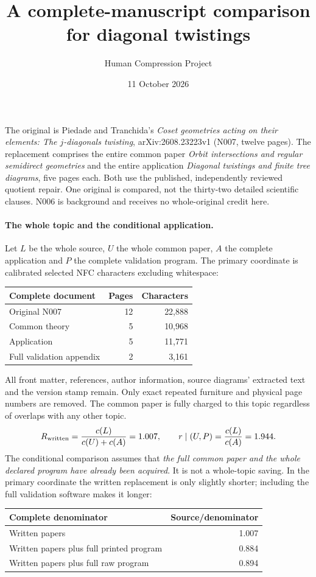 \documentclass[11pt,a4paper]{article}
\title{A complete-manuscript comparison for diagonal twistings}\author{Human Compression Project}\date{11 October 2026}
\begin{document}
\maketitle
The original is Piedade and Tranchida's \emph{Coset geometries acting on their elements: The $j$-diagonals twisting}, arXiv:2608.23223v1 (N007, twelve pages). The replacement comprises the entire common paper \emph{Orbit intersections and regular semidirect geometries} and the entire application \emph{Diagonal twistings and finite tree diagrams}, five pages each. Both use the published, independently reviewed quotient repair. One original is compared, not the thirty-two detailed scientific clauses. N006 is background and receives no whole-original credit here.

\paragraph{The whole topic and the conditional application.}
Let $L$ be the whole source, $U$ the whole common paper, $A$ the complete application and $P$ the complete validation program. The primary coordinate is calibrated selected NFC characters excluding whitespace:
\begin{center}\begin{tabular}{lrr}\toprule
Complete document & Pages & Characters\\\midrule
Original N007 & 12 & 22,888\\
Common theory & 5 & 10,968\\
Application & 5 & 11,771\\
Full validation appendix & 2 & 3,161\\\bottomrule
\end{tabular}\end{center}
All front matter, references, author information, source diagrams' extracted text and the version stamp remain. Only exact repeated furniture and physical page numbers are removed. The common paper is fully charged to this topic regardless of overlaps with any other topic.
\[
 R_{\rm written}=\frac{c(L)}{c(U)+c(A)}=1.007,\qquad
 r\mid(U,P)=\frac{c(L)}{c(A)}=1.944.
\]
The conditional comparison assumes that \emph{the full common paper and the whole declared program have already been acquired}. It is not a whole-topic saving. In the primary coordinate the written replacement is only slightly shorter; including the full validation software makes it longer:
\begin{center}\begin{tabular}{lr}\toprule
Complete denominator & Source/denominator\\\midrule
Written papers & 1.007\\
Written papers plus full printed program & 0.884\\
Written papers plus full raw program & 0.894\\\bottomrule
\end{tabular}\end{center}
\end{document}
